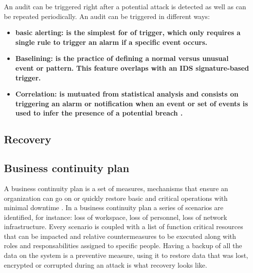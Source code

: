 An audit can be triggered right after a potential attack is detected as well as
can be repeated periodically. An audit can be triggered in different ways:
\begin{itemize}
  \item \bf{basic alerting}: is the simplest for of trigger, which only requires
  a single rule to trigger an alarm if a specific event occurs.
  \item \bf{Baselining}: is the practice of defining a normal versus unusual
  event or pattern. This feature overlaps with an IDS signature-based trigger.
  \item \bf{Correlation}: is mutuated from statistical analysis and consists on
  triggering an alarm or notification when an event or set of events is used to
  infer the presence of a potential breach \cite{WS15}.
\end{itemize}

\subsection{Recovery}

\subsection{Business continuity plan}
A business continuity plan is a set of measures, mechanisms that ensure an
organization can go on or quickly restore basic and critical operations
with minimal downtime \cite{TW10}. In a business continuity plan a series of
scenarios are identified, for instance: loss of workspace, loss of personnel,
loss of network infrastructure. Every scenario is coupled with a list of
function critical resources that can be impacted and relative countermeasures
to be executed along with roles and responsabilities assigned to
specific people. Having a backup of all the data on the system
is a preventive measure, using it to restore data that was lost, encrypted or
corrupted during an attack is what recovery looks like.

